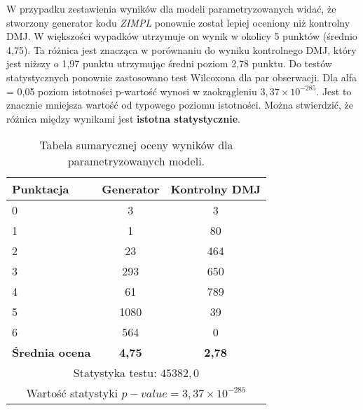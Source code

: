 W przypadku zestawienia wyników dla modeli parametryzowanych widać, że stworzony generator kodu \textit{ZIMPL} ponownie został lepiej oceniony niż kontrolny DMJ. W większości wypadków utrzymuje on wynik w okolicy 5 punktów (średnio 4,75). Ta różnica jest znacząca w porównaniu do wyniku kontrolnego DMJ, który jest niższy o 1,97 punktu utrzymując średni poziom 2,78 punktu. Do testów statystycznych ponownie zastosowano test Wilcoxona dla par obserwacji. Dla alfa = 0,05 poziom istotności p-wartość wynosi w zaokrągleniu \textbf{\( 3{,}37 \times 10^{-285} \)}. Jest to znacznie mniejsza wartość od typowego poziomu istotności. Można stwierdzić, że różnica między wynikami jest \textbf{istotna statystycznie}.

\begin{table}[H]
\caption{Tabela sumarycznej oceny wyników dla parametryzowanych modeli.}\label{tab:tabela23}
\centering%
\begin{tabular}{|l|c|c|}
\hline
\textbf{Punktacja} & \textbf{Generator} & \textbf{Kontrolny DMJ}\\
\hline
0 & 3 & 3 \\
\hline
1 & 1 & 80 \\
\hline
2 & 23 & 464 \\
\hline
3 & 293 & 650 \\
\hline
4 & 61 & 789 \\
\hline
5 & 1080 & 39 \\
\hline
6 & 564 & 0 \\
\hline
\textbf{Średnia ocena} & \textbf{4,75} & \textbf{2,78} \\
\hline
\multicolumn{3}{|c|}{Statystyka testu: \(45382,0\)} \\
\hline
\multicolumn{3}{|c|}{Wartość statystyki \(p-value = 3{,}37 \times 10^{-285} \)} \\
\hline
\end{tabular}
\end{table}

